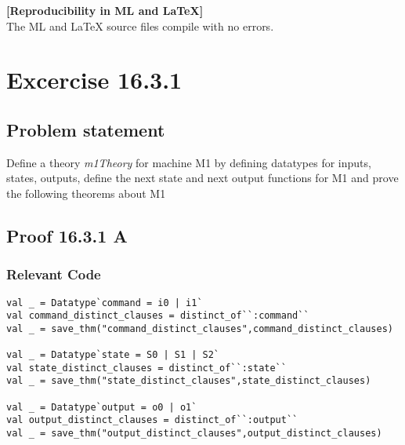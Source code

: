 \documentclass{report}
\begin{document}
\textbf{[Reproducibility in ML and \LaTeX{}]} \ \\
  The ML and \LaTeX{} source files compile with no errors.


\chapter{Excercise 16.3.1}
\label{cha:16.3.1}

\section{Problem statement}
\label{problem-statement-1}
Define a theory \emph{m1Theory} for machine M1 by defining datatypes
for inputs, states, outputs, define the next state and next output
functions for M1 and prove the following theorems about M1

\begin{quote}
\HOLmOneTheoremscommandXXdistinctXXclauses
{}\HOLmOneTheoremsstateXXdistinctXXclauses
{}\HOLmOneTheoremsoutputXXdistinctXXclauses
{}\HOLmOneTheoremsmOneTRXXrules
{}\HOLmOneTheoremsmOneTRXXclauses
{}\HOLmOneTheoremsmOneTransXXEquivXXTR
{}\HOLmOneTheoremsmOneXXrules
\end{quote}

\section{Proof 16.3.1 A}
\label{proof-1}

\subsection{Relevant Code}
\label{rel-code-1}
\begin{lstlisting}[frame=TBlr]
val _ = Datatype`command = i0 | i1`
val command_distinct_clauses = distinct_of``:command``
val _ = save_thm("command_distinct_clauses",command_distinct_clauses)

val _ = Datatype`state = S0 | S1 | S2`
val state_distinct_clauses = distinct_of``:state``
val _ = save_thm("state_distinct_clauses",state_distinct_clauses)

val _ = Datatype`output = o0 | o1`
val output_distinct_clauses = distinct_of``:output``
val _ = save_thm("output_distinct_clauses",output_distinct_clauses)

\end{lstlisting}
\end{document}

